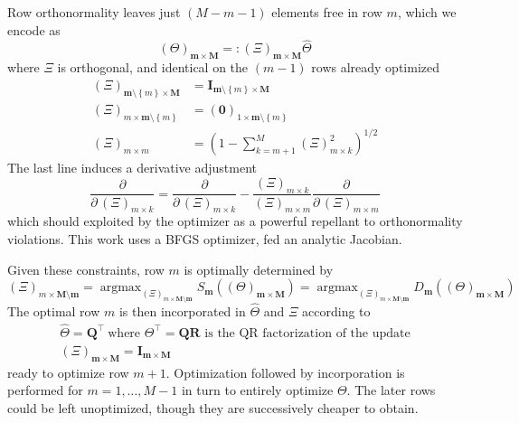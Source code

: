 \documentclass[preprint,12pt]{elsarticle}
\newcommand*{\M}[1]{\ensuremath{#1}\xspace}
\newcommand*{\vr}[1]{\M{\mathbf{#1}}}
\newcommand*{\deqr}{\M{=\mathrel{\mathop:}}}
\newcommand*{\set}[1]{\M{\left\lbrace#1\right\rbrace}}
\DeclareMathOperator*{\argmax}{argmax}
\begin{document}
            Row orthonormality leaves just $(M-m-1)$ elements free in row $m$, which we encode as
            \begin{equation} \label{eq:Method:BO:XiDef}
                (\Theta)_{\vr{m}\times\vr{M}} \deqr (\Xi)_{\vr{m}\times\vr{M}} \hat{\Theta}
            \end{equation}
            where \(\Xi\) is orthogonal, and identical on the $(m-1)$ rows already optimized
            \begin{equation} \label{eq:Method:BO:XiConstraints}
                \begin{aligned}
                    (\Xi)_{\vr{m}\setminus\set{m}\times\vr{M}} &= \vr{I}_{\vr{m}\setminus\set{m}\times\vr{M}} \\
                    (\Xi)_{m\times\vr{m}\setminus\set{m}} &= (\vr{0})_{1\times\vr{m}\setminus\set{m}} \\
                    (\Xi)_{m\times m} &= \left(1 - \sum_{k=m+1}^{M} (\Xi)_{m\times k}^{2} \right)^{1/2}
                \end{aligned}            
            \end{equation} \label{eq:Method:BO:Rotation}
            The last line induces a derivative adjustment
            \begin{equation} \label{eq:Method:BO:derivAdjust}
                \frac{\partial}{\partial\,(\Xi)_{m\times k}} = \frac{\partial}{\partial\,(\Xi)_{m\times k}} - 
                \frac{(\Xi)_{m \times k}}{(\Xi)_{m \times m}}\frac{\partial}{\partial\,(\Xi)_{m\times m}}
            \end{equation}
            which should exploited by the optimizer as a powerful repellant to orthonormality violations.
            This work uses a BFGS optimizer, fed an analytic Jacobian.

            Given these constraints, row $m$ is optimally determined by
            \begin{equation} \label{eq:Method:BO:Rotation}
                (\Xi)_{m\times\vr{M}\setminus\vr{m}} = \argmax_{(\Xi)_{m\times\vr{M}\setminus\vr{m}}} S_{\vr{m}}((\Theta)_{\vr{m}\times\vr{M}}) = \argmax_{(\Xi)_{m\times\vr{M}\setminus\vr{m}}} D_{\vr{m}}((\Theta)_{\vr{m}\times\vr{M}})
            \end{equation}
            The optimal row $m$ is then incorporated in $\hat{\Theta}$ and $\Xi$ according to
            \begin{equation} \label{eq:Method:BO:incorpUpadate}
                \begin{gathered}
                    \hat{\Theta} = \vr{Q}^{\intercal} \  \text{where } \Theta^{\intercal} = \vr{Q}\vr{R} \text{ is the QR factorization of the update} \\
                    (\Xi)_{\vr{m}\times\vr{M}} = \vr{I}_{\vr{m}\times\vr{M}}
                \end{gathered}
            \end{equation}        
            ready to optimize row $m+1$. 
            Optimization followed by incorporation is performed for $m=1,\ldots, M-1$ in turn to entirely optimize $\Theta$.
            The later rows could be left unoptimized, though they are successively cheaper to obtain.
    
\end{document}
